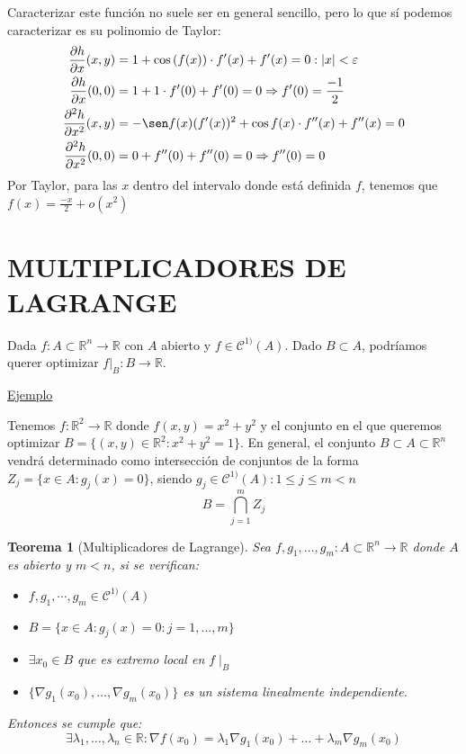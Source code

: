 \documentclass[10pt,a4paper,openright]{book}
\theoremstyle{break}
\newtheorem*{theo}{Teorema}
\begin{document}
Caracterizar este función no suele ser en general sencillo, pero lo que sí podemos caracterizar es su polinomio de Taylor:
\begin{align*}
\frac{\partial h}{\partial x}(x,y) &= 1 + \cos \left(f(x)\right) \cdot f'(x) + f'(x) = 0 : |x| < \varepsilon \\
\frac{\partial h}{\partial x} (0,0) &= 1 + 1 \cdot f'(0) + f'(0) = 0 \Rightarrow f'(0) = \frac{-1}{2} \\
\frac{\partial^2 h}{\partial x^2}(x,y) &= - \sen f(x) (f'(x))^2 + \cos f(x) \cdot f''(x) + f''(x) = 0 \\
\frac{\partial^2 h}{\partial x^2} (0,0) &= 0 + f''(0) + f''(0) = 0 \Rightarrow f''(0) = 0
\end{align*}
Por Taylor, para las $x$ dentro del intervalo donde está definida $f$, tenemos que $f(x) = \frac{-x}{2} + o(x^2)$

\newpage

\section*{MULTIPLICADORES DE LAGRANGE}
Dada $f: A \subset \mathbb{R}^n \to \mathbb{R}$ con $A$ abierto y $f \in \mathcal{C}^{1)}(A)$. Dado $B \subset A$, podríamos querer optimizar $f|_B : B \to \mathbb{R}$.

\underline{Ejemplo}

Tenemos $f : \mathbb{R}^2 \to \mathbb{R}$ donde $f(x,y) = x^2 + y^2$ y el conjunto en el que queremos optimizar $B = \{(x,y) \in \mathbb{R}^2 : x^2 + y^2 = 1\}$. En general, el conjunto $B \subset A  \subset \mathbb{R}^n$ vendrá determinado como intersección de conjuntos de la forma $Z_j = \{x \in A : g_j (x) = 0\}$, siendo $g_j \in \mathcal{C}^{1)} (A) : 1 \leq j \leq m < n$
$$B = \bigcap_{j = 1}^m Z_j$$

\begin{theo}[Multiplicadores de Lagrange]
Sea $f, g_1, \ldots, g_m : A \subset \mathbb{R}^n \to \mathbb{R}$ donde $A$ es abierto y $m < n$, si se verifican:
\begin{itemize}
\item $f, g_1, \cdots, g_m \in \mathcal{C}^{1)} (A)$
\item $B = \{x \in A: g_j (x) = 0 : j =1, \ldots, m\}$
\item $\exists x_0 \in B$ que es extremo local en $f\mid_B$
\item $\{\nabla g_1(x_0), \ldots, \nabla g_m(x_0)\}$ es un sistema linealmente independiente.
\end{itemize}
Entonces se cumple que:
$$\exists \lambda_1, \ldots, \lambda_n \in \mathbb{R} : \nabla f(x_0) = \lambda_1 \nabla g_1 (x_0) + \ldots + \lambda_m \nabla g_m (x_0)$$
\end{theo}
\end{document}
